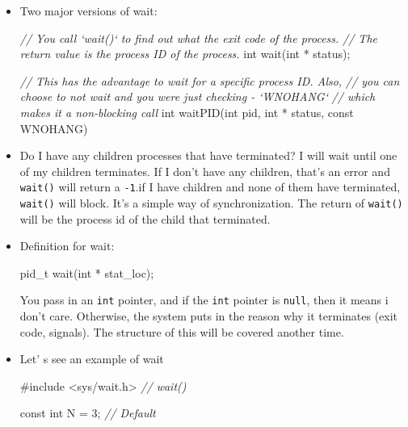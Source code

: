 \documentclass[]{article}
\newenvironment{Shaded}{}{}
\newcommand{\DataTypeTok}[1]{\textcolor[rgb]{0.56,0.13,0.00}{#1}}
\newcommand{\DecValTok}[1]{\textcolor[rgb]{0.25,0.63,0.44}{#1}}
\newcommand{\ImportTok}[1]{#1}
\newcommand{\CommentTok}[1]{\textcolor[rgb]{0.38,0.63,0.69}{\textit{#1}}}
\newcommand{\PreprocessorTok}[1]{\textcolor[rgb]{0.74,0.48,0.00}{#1}}
\newcommand{\NormalTok}[1]{#1}
\begin{document}
\begin{itemize}
\item
  Two major versions of wait:

\begin{Shaded}
\begin{Highlighting}[]
\CommentTok{// You call `wait()` to find out what the exit code of the process. }
\CommentTok{// The return value is the process ID of the process.}
\DataTypeTok{int}\NormalTok{ wait(}\DataTypeTok{int}\NormalTok{ * status);}

\CommentTok{// This has the advantage to wait for a specific process ID. Also, }
\CommentTok{// you can choose to not wait and you were just checking - `WNOHANG` }
\CommentTok{// which makes it a non-blocking call}
\DataTypeTok{int}\NormalTok{ waitPID(}\DataTypeTok{int}\NormalTok{ pid, }\DataTypeTok{int}\NormalTok{ * status, }\DataTypeTok{const}\NormalTok{ WNOHANG)}
\end{Highlighting}
\end{Shaded}
\item
  Do I have any children processes that have terminated? I will wait
  until one of my children terminates. If I don't have any children,
  that's an error and \texttt{wait()} will return a \texttt{-1}.if I
  have children and none of them have terminated, \texttt{wait()} will
  block. It's a simple way of synchronization. The return of
  \texttt{wait()} will be the process id of the child that terminated.
\item
  Definition for wait:

\begin{Shaded}
\begin{Highlighting}[]
\NormalTok{pid_t wait(}\DataTypeTok{int}\NormalTok{ * stat_loc);}
\end{Highlighting}
\end{Shaded}

  You pass in an \texttt{int} pointer, and if the \texttt{int} pointer
  is \texttt{null}, then it means i don't care. Otherwise, the system
  puts in the reason why it terminates (exit code, signals). The
  structure of this will be covered another time.
\item
  Let' s see an example of wait

\begin{Shaded}
\begin{Highlighting}[]
\PreprocessorTok{#include }\ImportTok{<sys/wait.h>}\PreprocessorTok{	}\CommentTok{// wait()}

\DataTypeTok{const} \DataTypeTok{int}\NormalTok{ N = }\DecValTok{3}\NormalTok{;		}\CommentTok{// Default}


\end{Highlighting}
\end{Shaded}
\end{itemize}
\end{document}
